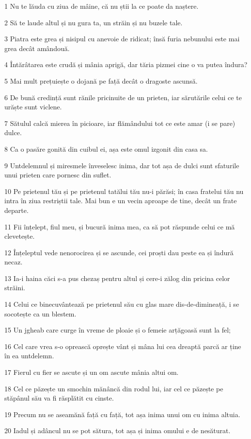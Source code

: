 \par 1 Nu te lăuda cu ziua de mâine, că nu știi la ce poate da naștere.
\par 2 Să te laude altul și nu gura ta, un străin și nu buzele tale.
\par 3 Piatra este grea și nisipul cu anevoie de ridicat; însă furia nebunului este mai grea decât amândouă.
\par 4 Întărâtarea este crudă și mânia aprigă, dar tăria pizmei cine o va putea îndura?
\par 5 Mai mult prețuiește o dojană pe față decât o dragoste ascunsă.
\par 6 De bună credință sunt rănile pricinuite de un prieten, iar sărutările celui ce te urăște sunt viclene.
\par 7 Sătulul calcă mierea în picioare, iar flămândului tot ce este amar (i se pare) dulce.
\par 8 Ca o pasăre gonită din cuibul ei, așa este omul izgonit din casa sa.
\par 9 Untdelemnul și miresmele înveselesc inima, dar tot așa de dulci sunt sfaturile unui prieten care pornesc din suflet.
\par 10 Pe prietenul tău și pe prietenul tatălui tău nu-i părăsi; în casa fratelui tău nu intra în ziua restriștii tale. Mai bun e un vecin aproape de tine, decât un frate departe.
\par 11 Fii înțelept, fiul meu, și bucură inima mea, ca să pot răspunde celui ce mă clevetește.
\par 12 Înțeleptul vede nenorocirea și se ascunde, cei proști dau peste ea și îndură necaz.
\par 13 Ia-i haina căci s-a pus chezaș pentru altul și cere-i zălog din pricina celor străini.
\par 14 Celui ce binecuvântează pe prietenul său cu glas mare dis-de-dimineață, i se socotește ca un blestem.
\par 15 Un jgheab care curge în vreme de ploaie și o femeie arțăgoasă sunt la fel;
\par 16 Cel care vrea s-o oprească oprește vânt și mâna lui cea dreaptă parcă ar ține în ea untdelemn.
\par 17 Fierul cu fier se ascute și un om ascute mânia altui om.
\par 18 Cel ce păzește un smochin mănâncă din rodul lui, iar cel ce păzește pe stăpânul său va fi răsplătit cu cinste.
\par 19 Precum nu se aseamănă față cu față, tot așa inima unui om cu inima altuia.
\par 20 Iadul și adâncul nu se pot sătura, tot așa și inima omului e de nesăturat.
